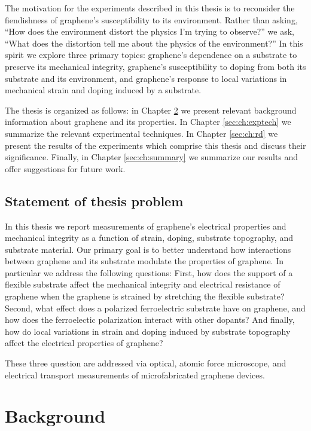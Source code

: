 \documentclass[edeposit,fullpage,draftthesis]{uiucthesis2009}
\begin{document}
    The motivation for the experiments described in this thesis is to reconsider the fiendishness
    of graphene's susceptibility to its environment. Rather than asking, ``How does the environment
    distort the physics I'm trying to observe?'' we ask, ``What does the distortion tell me about
    the physics of the environment?'' In this spirit we explore three primary topics:
    graphene's dependence on a substrate to preserve its mechanical integrity,
    graphene's susceptibility to doping from both its substrate and its environment, and
    graphene's response to local variations in mechanical strain and doping induced by a substrate.
    
    The thesis is organized as follows: in Chapter \ref{sec:ch:bg} we present relevant background
    information about graphene and its properties. In Chapter \ref{sec:ch:exptech} we summarize
    the relevant experimental techniques. In Chapter \ref{sec:ch:rd} we present the results of the experiments
    which comprise this thesis and discuss their significance. Finally, in Chapter \ref{sec:ch:summary}
    we summarize our results and offer suggestions for future work.
    
    \section{Statement of thesis problem}
    
    In this thesis we report measurements of graphene's electrical properties and mechanical
    integrity as a function of strain, doping, substrate topography, and substrate material.
    Our primary goal is to better understand how interactions between graphene
    and its substrate modulate the properties of graphene. 
    In particular we address the following questions: 
    First, how does the support of a flexible substrate affect the mechanical integrity and 
    electrical resistance of graphene when the graphene is strained by stretching the flexible substrate?
    Second, what effect does a polarized ferroelectric substrate have on graphene, and how 
    does the ferroelectic polarization interact with other dopants? And finally, how do local
    variations in strain and doping induced by substrate topography affect the electrical properties of graphene?
    
    These three question are addressed via optical, atomic force microscope, and electrical transport
    measurements of microfabricated graphene devices. 

\chapter{Background}
\label{sec:ch:bg}
\end{document}
